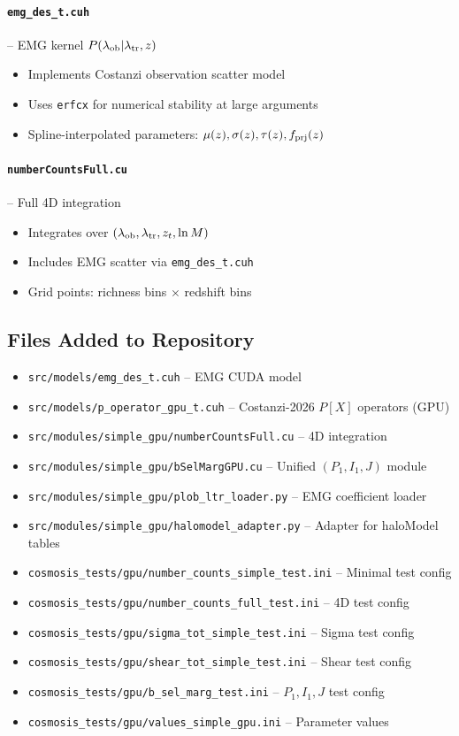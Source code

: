 \documentclass[a4paper, 11pt]{article}
\newcommand{\filepath}[1]{{\small\texttt{#1}}}
\begin{document}
\paragraph{\texttt{emg\_des\_t.cuh}} -- EMG kernel $P(\lambda_{\rm ob}|\lambda_{\rm tr},z)$
\begin{itemize}
  \item Implements Costanzi observation scatter model
  \item Uses \texttt{erfcx} for numerical stability at large arguments
  \item Spline-interpolated parameters: $\mu(z), \sigma(z), \tau(z), f_{\rm prj}(z)$
\end{itemize}

\paragraph{\texttt{numberCountsFull.cu}} -- Full 4D integration
\begin{itemize}
  \item Integrates over $(\lambda_{\rm ob}, \lambda_{\rm tr}, z_t, \ln M)$
  \item Includes EMG scatter via \texttt{emg\_des\_t.cuh}
  \item Grid points: richness bins $\times$ redshift bins
\end{itemize}

\subsection{Files Added to Repository}

\begin{itemize}
  \setlength\itemsep{2pt}
  \item \filepath{src/models/emg\_des\_t.cuh} -- EMG CUDA model
  \item \filepath{src/models/p\_operator\_gpu\_t.cuh} -- Costanzi-2026 $P[X]$ operators (GPU)
  \item \filepath{src/modules/simple\_gpu/numberCountsFull.cu} -- 4D integration
  \item \filepath{src/modules/simple\_gpu/bSelMargGPU.cu} -- Unified $(P_1, I_1, J)$ module
  \item \filepath{src/modules/simple\_gpu/plob\_ltr\_loader.py} -- EMG coefficient loader
  \item \filepath{src/modules/simple\_gpu/halomodel\_adapter.py} -- Adapter for haloModel tables
  \item \filepath{cosmosis\_tests/gpu/number\_counts\_simple\_test.ini} -- Minimal test config
  \item \filepath{cosmosis\_tests/gpu/number\_counts\_full\_test.ini} -- 4D test config
  \item \filepath{cosmosis\_tests/gpu/sigma\_tot\_simple\_test.ini} -- Sigma test config
  \item \filepath{cosmosis\_tests/gpu/shear\_tot\_simple\_test.ini} -- Shear test config
  \item \filepath{cosmosis\_tests/gpu/b\_sel\_marg\_test.ini} -- $P_1, I_1, J$ test config
  \item \filepath{cosmosis\_tests/gpu/values\_simple\_gpu.ini} -- Parameter values
\end{itemize}
\end{document}
